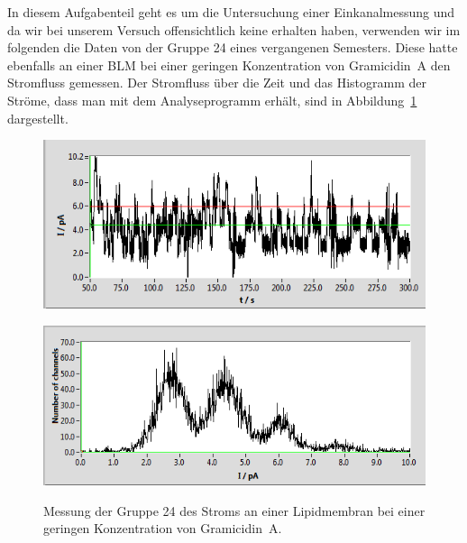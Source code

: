 \documentclass[a4paper,ngerman]{scrartcl}
\begin{document}
In diesem Aufgabenteil geht es um die Untersuchung einer Einkanalmessung und da wir bei unserem Versuch offensichtlich keine erhalten haben,
verwenden wir im folgenden die Daten von der Gruppe 24 eines vergangenen Semesters. Diese hatte ebenfalls an einer BLM bei einer geringen 
Konzentration von Gramicidin~A den Stromfluss gemessen. Der Stromfluss über die Zeit und das Histogramm der Ströme, dass man mit dem
Analyseprogramm erhält, sind in Abbildung~\ref{fig:einkanal_gr24} dargestellt.\\

\begin{figure}[tbh!]
  \centering
  \begin{minipage}[b]{.7\textwidth}
    \includegraphics[width=1.\textwidth]{abbildungen/einkanal_gruppe24_raw.png}
    \label{fig:einkanal_gr24_roh}
  \end{minipage}
  \begin{minipage}[b]{.7\textwidth}
    \includegraphics[width=1.\textwidth]{abbildungen/einkanal_gruppe24_hist.png}
    \label{fig:einkanal_gr24_hist}
  \end{minipage}
\caption{Messung der Gruppe 24 des Stroms an einer Lipidmembran bei einer geringen Konzentration von Gramicidin~A.}
\label{fig:einkanal_gr24}
\end{figure}
\end{document}
